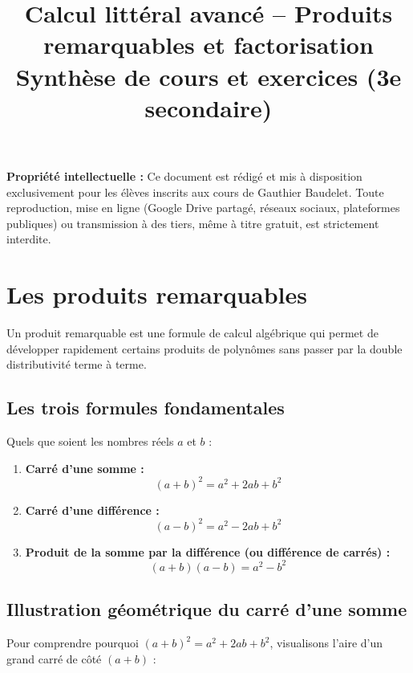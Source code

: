 \documentclass[11pt,a4paper]{article}
\title{\textbf{Calcul littéral avancé -- Produits remarquables et factorisation}\\[2pt]\large Synthèse de cours et exercices (3e secondaire)}
\author{}
\date{}
\begin{document}
\maketitle
\thispagestyle{fancy}
\vspace{-2cm}
\textbf{Propriété intellectuelle :} Ce document est rédigé et mis à disposition exclusivement pour les élèves inscrits aux cours de Gauthier Baudelet. Toute reproduction, mise en ligne (Google Drive partagé, réseaux sociaux, plateformes publiques) ou transmission à des tiers, même à titre gratuit, est strictement interdite.
\section{Les produits remarquables}

Un produit remarquable est une formule de calcul algébrique qui permet de développer rapidement certains produits de polynômes sans passer par la double distributivité terme à terme.

\subsection{Les trois formules fondamentales}

\begin{propriete}
Quels que soient les nombres réels $a$ et $b$ :
\begin{enumerate}[label=\textbf{(\arabic*)}]
  \item \textbf{Carré d'une somme :} 
  \[
  (a + b)^2 = a^2 + 2ab + b^2
  \]
  \item \textbf{Carré d'une différence :} 
  \[
  (a - b)^2 = a^2 - 2ab + b^2
  \]
  \item \textbf{Produit de la somme par la différence (ou différence de carrés) :} 
  \[
  (a + b)(a - b) = a^2 - b^2
  \]
\end{enumerate}
\end{propriete}

\subsection{Illustration géométrique du carré d'une somme}

Pour comprendre pourquoi $(a+b)^2 = a^2 + 2ab + b^2$, visualisons l'aire d'un grand carré de côté $(a+b)$ :
\end{document}
